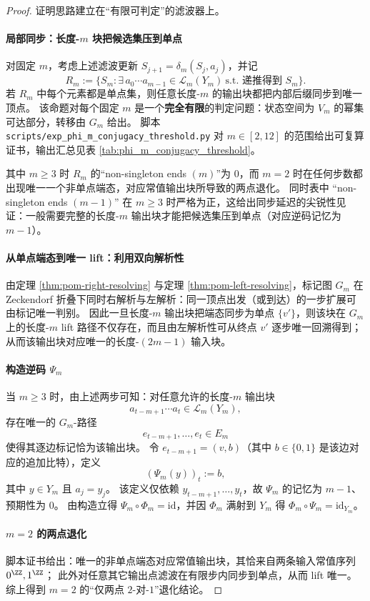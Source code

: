 \begin{proof}
证明思路建立在“有限可判定”的滤波器上。

\paragraph{局部同步：长度-$m$ 块把候选集压到单点}
对固定 $m$，考虑上述滤波更新 $S_{j+1}=\delta_m(S_j,a_j)$，并记
$$
R_m:=\{S_m:\exists\,a_0\cdots a_{m-1}\in\mathcal{L}_m(Y_m)\ \text{s.t. 递推得到 }S_m\}.
$$
若 $R_m$ 中每个元素都是单点集，则任意长度-$m$ 的输出块都把内部后缀同步到唯一顶点。
该命题对每个固定 $m$ 是一个\textbf{完全有限}的判定问题：状态空间为 $V_m$ 的幂集可达部分，转移由 $G_m$ 给出。
脚本 \texttt{scripts/exp\_phi\_m\_conjugacy\_threshold.py} 对 $m\in[2,12]$ 的范围给出可复算证书，输出汇总见表 \ref{tab:phi_m_conjugacy_threshold}。

其中 $m\ge 3$ 时 $R_m$ 的“non-singleton ends $(m)$”为 $0$，而 $m=2$ 时在任何步数都出现唯一一个非单点端态，对应常值输出块所导致的两点退化。
同时表中 “non-singleton ends $(m-1)$” 在 $m\ge 3$ 时严格为正，这给出同步延迟的尖锐性见证：一般需要完整的长度-$m$ 输出块才能把候选集压到单点（对应逆码记忆为 $m-1$）。

\paragraph{从单点端态到唯一 lift：利用双向解析性}
由定理 \ref{thm:pom-right-resolving} 与定理 \ref{thm:pom-left-resolving}，标记图 $G_m$ 在 Zeckendorf 折叠下同时右解析与左解析：同一顶点出发（或到达）的一步扩展可由标记唯一判别。
因此一旦长度-$m$ 输出块把端态同步为单点 $\{v'\}$，则该块在 $G_m$ 上的长度-$m$ lift 路径不仅存在，而且由左解析性可从终点 $v'$ 逐步唯一回溯得到；从而该输出块对应唯一的长度-$(2m-1)$ 输入块。

\paragraph{构造逆码 \texorpdfstring{$\Psi_m$}{Psi\_m}}
当 $m\ge 3$ 时，由上述两步可知：对任意允许的长度-$m$ 输出块
$$
a_{t-m+1}\cdots a_t\in\mathcal{L}_m(Y_m),
$$
存在唯一的 $G_m$-路径
$$
e_{t-m+1},\dots,e_t\in E_m
$$
使得其逐边标记恰为该输出块。
令 $e_{t-m+1}=(v,b)$（其中 $b\in\{0,1\}$ 是该边对应的追加比特），定义
$$
(\Psi_m(y))_t:=b,
$$
其中 $y\in Y_m$ 且 $a_j=y_j$。
该定义仅依赖 $y_{t-m+1},\dots,y_t$，故 $\Psi_m$ 的记忆为 $m-1$、预期性为 $0$。
由构造立得 $\Psi_m\circ\Phi_m=\mathrm{id}$，并因 $\Phi_m$ 满射到 $Y_m$ 得 $\Phi_m\circ\Psi_m=\mathrm{id}_{Y_m}$。

\paragraph{$m=2$ 的两点退化}
脚本证书给出：唯一的非单点端态对应常值输出块，其恰来自两条输入常值序列 $0^{\ZZ},1^{\ZZ}$；
此外对任意其它输出点滤波在有限步内同步到单点，从而 lift 唯一。
综上得到 $m=2$ 的“仅两点 $2$-对-$1$”退化结论。
\end{proof}

